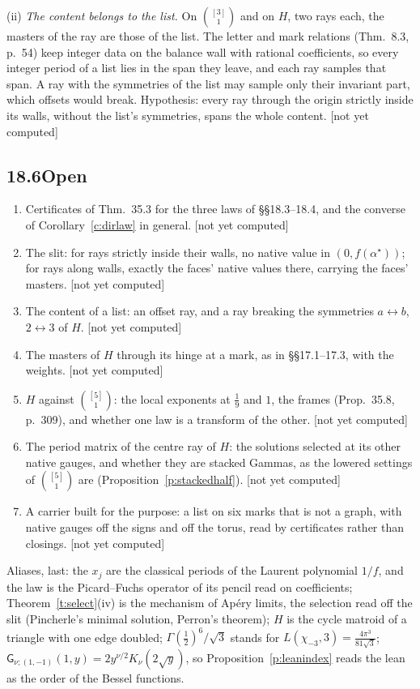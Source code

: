 \documentclass[11pt]{article}
\newcommand{\sG}{\mathsf G}
\theoremstyle{plain}
\theoremstyle{definition}
\theoremstyle{remark}
\newcommand{\notyet}{\textup{[not yet computed]}}
\begin{document}
(ii) \emph{The content belongs to the list.} On $\binom{[3]}1$ and on $H$, two rays each, the masters of the ray are those of the list. The letter and mark relations (Thm.~8.3, p.~54) keep integer data on the balance wall with rational coefficients, so every integer period of a list lies in the span they leave, and each ray samples that span. A ray with the symmetries of the list may sample only their invariant part, which offsets would break. Hypothesis: every ray through the origin strictly inside its walls, without the list's symmetries, spans the whole content. \notyet

\subsection*{18.6\quad Open}

\begin{enumerate}[label=(\roman*)]
\item Certificates of Thm.~35.3 for the three laws of \S\S18.3--18.4, and the converse of Corollary~\ref{c:dirlaw} in general. \notyet
\item The slit: for rays strictly inside their walls, no native value in $(0,f(\alpha^\star))$; for rays along walls, exactly the faces' native values there, carrying the faces' masters. \notyet
\item The content of a list: an offset ray, and a ray breaking the symmetries $a\leftrightarrow b$, $2\leftrightarrow3$ of $H$. \notyet
\item The masters of $H$ through its hinge at a mark, as in \S\S17.1--17.3, with the weights. \notyet
\item $H$ against $\binom{[5]}1$: the local exponents at $\frac19$ and $1$, the frames (Prop.~35.8, p.~309), and whether one law is a transform of the other. \notyet
\item The period matrix of the centre ray of $H$: the solutions selected at its other native gauges, and whether they are stacked Gammas, as the lowered settings of $\binom{[5]}1$ are (Proposition~\ref{p:stackedhalf}). \notyet
\item A carrier built for the purpose: a list on six marks that is not a graph, with native gauges off the signs and off the torus, read by certificates rather than closings. \notyet
\end{enumerate}

\noindent Aliases, last: the $x_j$ are the classical periods of the Laurent polynomial $1/f$, and the law is the Picard--Fuchs operator of its pencil read on coefficients; Theorem~\ref{t:select}(iv) is the mechanism of Ap\'ery limits, the selection read off the slit (Pincherle's minimal solution, Perron's theorem); $H$ is the cycle matroid of a triangle with one edge doubled; $\Gamma(\frac12)^6/\sqrt3$ stands for $L(\chi_{-3},3)=\frac{4\pi^3}{81\sqrt3}$; $\sG_{\nu;(1,-1)}(1,y)=2y^{\nu/2}K_\nu(2\sqrt y)$, so Proposition~\ref{p:leanindex} reads the lean as the order of the Bessel functions.
\end{document}

